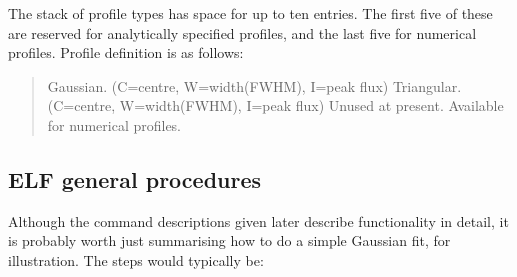 The stack of profile types has space for up to ten entries. The first
five of these are reserved for analytically specified profiles, and
the last five for numerical profiles. Profile definition is as
follows:

\begin{quote}
\begin{dipdesc}
 {Gaussian. (C=centre, W=width(FWHM), I=peak flux)}
 {Triangular. (C=centre, W=width(FWHM), I=peak flux)}
 {Unused at present.}
 {Available for numerical profiles.}
\end{dipdesc}
\end{quote}

\subsection {ELF general procedures}

Although the command descriptions given later describe functionality
in detail, it is probably worth just summarising how to do a simple
Gaussian fit, for illustration. The steps would typically be:

